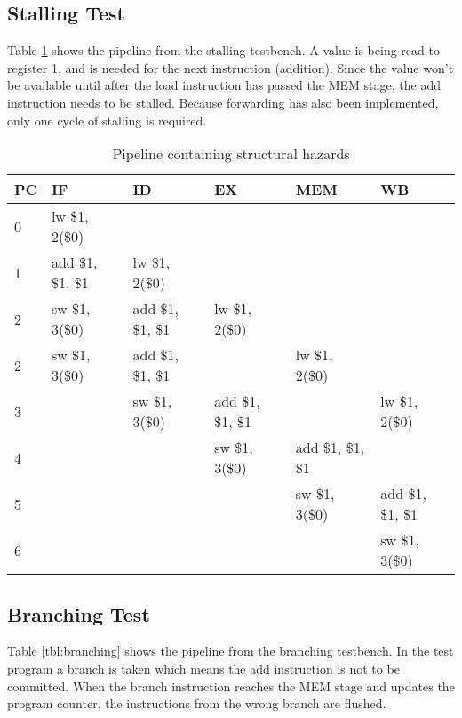 \subsection{Stalling Test}
Table \ref{tbl:stalling} shows the pipeline from the stalling testbench.
A value is being read to register 1, and is needed for the next instruction (addition).
Since the value won't be available until after the load instruction has passed the MEM stage,
the add instruction needs to be stalled.
Because forwarding has also been implemented, only one cycle of stalling is required.
\begin{table}[h]
    \begin{tabular}{l|lllll}
    PC & IF                & ID                & EX                & MEM               & WB                \\ \hline
    0  & lw \$1, 2(\$0)    & ~                 & ~                 & ~                 & ~                 \\
    1  & add \$1, \$1, \$1 & lw \$1, 2(\$0)    & ~                 & ~                 & ~                 \\
    2  & sw \$1, 3(\$0)    & add \$1, \$1, \$1 & lw \$1, 2(\$0)    & ~                 & ~                 \\
    2  & sw \$1, 3(\$0)    & add \$1, \$1, \$1 & ~                 & lw \$1, 2(\$0)    & ~                 \\
    3  & ~                 & sw \$1, 3(\$0)    & add \$1, \$1, \$1 & ~                 & lw \$1, 2(\$0)    \\
    4  & ~                 & ~                 & sw \$1, 3(\$0)    & add \$1, \$1, \$1 & ~                 \\
    5  & ~                 & ~                 & ~                 & sw \$1, 3(\$0)    & add \$1, \$1, \$1 \\
    6  & ~                 & ~                 & ~                 & ~                 & sw \$1, 3(\$0)    \\
    \end{tabular}
\caption{Pipeline containing structural hazards}
\label{tbl:stalling}
\end{table}

\subsection{Branching Test}
Table \ref{tbl:branching} shows the pipeline from the branching testbench.
In the test program a branch is taken which means the add instruction is not to be committed.
When the branch instruction reaches the MEM stage and updates the program counter,
the instructions from the wrong branch are flushed.

